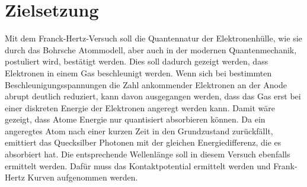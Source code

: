 \section{Zielsetzung}
Mit dem Franck-Hertz-Versuch soll die Quantennatur der Elektronenhülle,
wie sie durch das Bohrsche Atommodell, aber auch in der modernen Quantenmechanik,
postuliert wird, bestätigt werden. Dies soll dadurch gezeigt werden, dass Elektronen
in einem Gas beschleunigt werden. Wenn sich bei bestimmten Beschleunigungsspannungen die Zahl
ankommender Elektronen an der Anode abrupt deutlich reduziert, kann davon ausgegangen werden, dass das Gas erst bei einer diskreten 
Energie der Elektronen angeregt werden kann. Damit wäre gezeigt, dass Atome Energie nur 
quantisiert absorbieren können. Da ein angeregtes Atom nach einer kurzen Zeit in den Grundzustand
zurückfällt, emittiert das Quecksilber Photonen mit der gleichen Energiedifferenz, die es absorbiert hat.
Die entsprechende Wellenlänge soll in diesem Versuch ebenfalls ermittelt werden. Dafür muss das Kontaktpotential 
ermittelt werden und Frank-Hertz Kurven aufgenommen werden.
